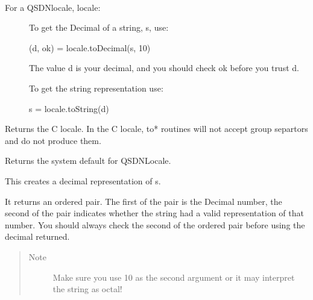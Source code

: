\documentclass[letterpaper,10pt,english]{sphinxmanual}
\begin{document}
\begin{fulllineitems}
\label{index:qsdn.QSDNLocale}~\begin{description}
\item[{For a QSDNlocale, locale:  }] \leavevmode
To get the Decimal of a string, s, use:

(d, ok) = locale.toDecimal(s, 10)

The value d is your decimal, and you should check ok before you trust d.

To get the string representation use:

s = locale.toString(d)

\end{description}

\begin{fulllineitems}
\label{index:qsdn.QSDNLocale.c}
Returns the C locale.  In the C locale, to* routines will not accept group separtors and do not produce them.

\end{fulllineitems}


\begin{fulllineitems}
\label{index:qsdn.QSDNLocale.system}
Returns the system default for QSDNLocale.

\end{fulllineitems}


\begin{fulllineitems}
\label{index:qsdn.QSDNLocale.toDecimal}
This creates a decimal representation of s.

It returns an ordered pair.  The first of the pair is the Decimal number, the second of the pair indicates whether the string had a valid representation of that number.  You should always check the second of the ordered pair before using the decimal returned.
\begin{quote}\begin{description}
\item[{Note }] \leavevmode
Make sure you use 10 as the second argument or it may interpret the string as octal!


\end{description}
\end{quote}
\end{fulllineitems}
\end{fulllineitems}
\end{document}
